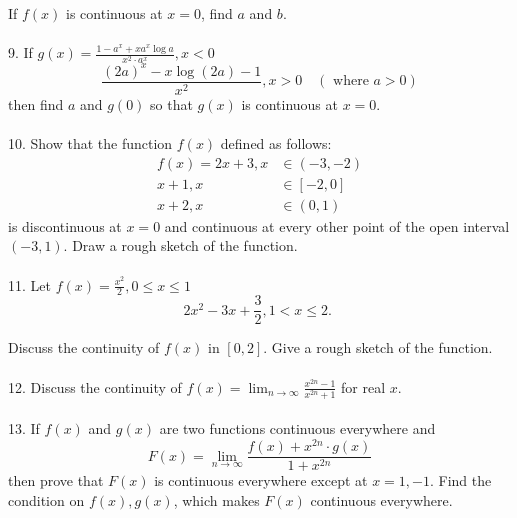 If $f(x)$ is continuous at $x=0$, find $a$ and $b$.\\\\
9. If $g(x)=\frac{1-a^x+x a^x \log a}{x^2 \cdot a^x}, x<0$
$$
\frac{(2 a)^x-x \log (2 a)-1}{x^2}, x>0 \quad(\text { where } a>0)
$$
then find $a$ and $g(0)$ so that $g(x)$ is continuous at $x=0$.\\\\
10. Show that the function $f(x)$ defined as follows:
$$
\begin{aligned}
f(x)=2 x+3, x & \in(-3,-2) \\
x+1, x & \in[-2,0] \\
x+2, x & \in(0,1)
\end{aligned}
$$
is discontinuous at $x=0$ and continuous at every other point of the open interval $(-3,1)$. Draw a rough sketch of the function.\\\\
11. Let $f(x)=\frac{x^2}{2}, 0 \leq x \leq 1$
$$
2 x^2-3 x+\frac{3}{2}, 1<x \leq 2 \text {. }
$$

Discuss the continuity of $f(x)$ in $[0,2]$. Give a rough sketch of the function.\\\\
12. Discuss the continuity of $f(x)=\lim _{n \rightarrow \infty} \frac{x^{2 n}-1}{x^{2 n}+1}$ for real $x$.\\\\
13. If $f(x)$ and $g(x)$ are two functions continuous everywhere and
$$
F(x)=\lim _{n \rightarrow \infty} \frac{f(x)+x^{2 n} \cdot g(x)}{1+x^{2 n}}
$$
then prove that $F(x)$ is continuous everywhere except at $x=1,-1$. Find the condition on $f(x), g(x)$, which makes $F(x)$ continuous everywhere.\\\\

